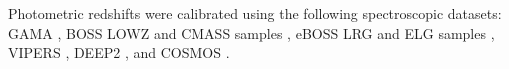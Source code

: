 \documentclass[twocolumn]{aastex631}
\begin{document}
Photometric redshifts were calibrated using the following spectroscopic datasets: GAMA \citep[DR2; ][]{2015MNRAS.452.2087L}, BOSS LOWZ and CMASS samples \citep[DR12; ][]{2015ApJS..219...12A}, eBOSS LRG and ELG samples \citep[DR16; ][]{2020ApJS..249....3A}, VIPERS \citep[DR2; ][]{2018A&A...609A..84S}, DEEP2 \citep{2013ApJS..208....5N}, and COSMOS  \citep[][; with a magnitude cut of ${\tt r\_MAG\_APER2} \leq 23$]{2009ApJ...690.1236I}. 
\end{document}
